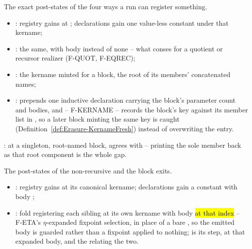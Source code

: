 \begin{definition}
\label{def:Erasure-addAxiomState}
\leanok
{}
 The exact post-states of the four ways a run can register something.
\begin{itemize}
\item {}: registry gains  at ; declarations gain one
value-less constant under that kername;
\item {}: the same, with body  instead of none -- what
 conses for a quotient or recursor realizer (F-QUOT, F-EQREC);
\item {}: the kername minted for a block, the root of its members' concatenated
names;
\item {}: prepends one inductive declaration carrying the block's
parameter count and bodies, and -- F-KERNAME -- records the block's key against its member list in
, so a later block minting the same key is caught (Definition~\ref{def:Erasure-KernameFresh})
instead of overwriting the entry.
\end{itemize}
 : at a singleton, root-named block,
 agrees with  -- printing the sole member back as that root
component is the whole gap.
\end{definition}

\begin{definition}
\label{def:Erasure-nonrecConstState}
\leanok
{}
 The post-states of the non-recursive and the block exits.
\begin{itemize}
\item {}: registry gains  at its canonical kername; declarations
gain a constant with body ;
\item {}: fold registering each sibling at its own kername with body
\hl{ at that index} -- F-ETA's $\eta$-expanded fixpoint selection, in place
of a bare , so the emitted body is guarded rather than a fixpoint applied to
nothing;  is its step,  at that expanded body, and
 the  relating the two.
\end{itemize}
\end{definition}

